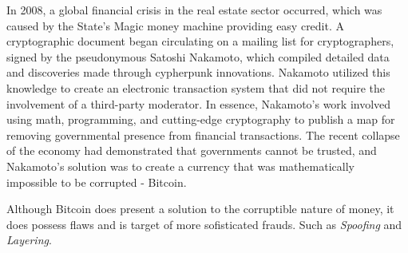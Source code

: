 In 2008, a global financial crisis in the real estate sector occurred, which was caused by the State's Magic money machine providing easy credit. A 
cryptographic document began circulating on a mailing list for cryptographers, signed by the pseudonymous Satoshi Nakamoto, which compiled detailed 
data and discoveries made through cypherpunk innovations. Nakamoto utilized this knowledge to create an electronic transaction system that did not 
require the involvement of a third-party moderator. In essence, Nakamoto's work involved using math, programming, and cutting-edge cryptography to 
publish a map for removing governmental presence from financial transactions. The recent collapse of the economy had demonstrated that governments 
cannot be trusted, and Nakamoto's solution was to create a currency that was mathematically impossible to be corrupted - Bitcoin.

Although Bitcoin does present a solution to the corruptible nature of money, it does possess flaws and is target of more sofisticated frauds. Such 
as \textit{Spoofing} and \textit{Layering}. 
